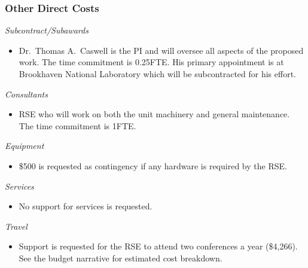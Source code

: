 \documentclass[12pt]{article}
\numberwithin{page}{section}
\begin{document}
\subsubsection{Other Direct Costs}
\textit{Subcontract/Subawards}
\begin{itemize}
\item Dr.\ Thomas A.\ Caswell is the PI and will oversee all aspects of the
  proposed work.  The time commitment is 0.25FTE.  His primary
  appointment is at Brookhaven National Laboratory which will be
  subcontracted for his effort.
\end{itemize}
\textit{Consultants}
\begin{itemize}
\item RSE who will work on both the unit machinery and general
  maintenance.  The time commitment is 1FTE.
\end{itemize}
\textit{Equipment}
\begin{itemize}
\item \$500 is requested as contingency if any hardware is required by the RSE.
\end{itemize}
\textit{Services}
\begin{itemize}
\item No support for services is requested.
\end{itemize}
\textit{Travel}
\begin{itemize}
\item Support is requested for the RSE to attend two conferences a
  year (\$4,266).  See the budget narrative for estimated cost
  breakdown.
\end{itemize}
\end{document}
